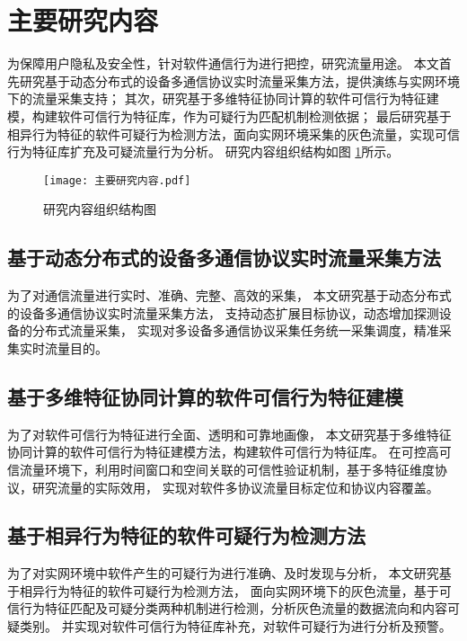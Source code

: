 \section{主要研究内容}

为保障用户隐私及安全性，针对软件通信行为进行把控，研究流量用途。
本文首先研究基于动态分布式的设备多通信协议实时流量采集方法，提供演练与实网环境下的流量采集支持；
其次，研究基于多维特征协同计算的软件可信行为特征建模，构建软件可信行为特征库，作为可疑行为匹配机制检测依据；
最后研究基于相异行为特征的软件可疑行为检测方法，面向实网环境采集的灰色流量，实现可信行为特征库扩充及可疑流量行为分析。
研究内容组织结构如图 \ref{fig:研究内容组织结构图}所示。


 
\FloatBarrier

\begin{figure}[ht]
  \centering
  \texttt{[image: 主要研究内容.pdf]}
  \caption{研究内容组织结构图}
  \label{fig:研究内容组织结构图}
\end{figure} 

\FloatBarrier
 
\subsection{基于动态分布式的设备多通信协议实时流量采集方法}

为了对通信流量进行实时、准确、完整、高效的采集，
本文研究基于动态分布式的设备多通信协议实时流量采集方法，
支持动态扩展目标协议，动态增加探测设备的分布式流量采集，
实现对多设备多通信协议采集任务统一采集调度，精准采集实时流量目的。

\subsection{基于多维特征协同计算的软件可信行为特征建模}

为了对软件可信行为特征进行全面、透明和可靠地画像，
本文研究基于多维特征协同计算的软件可信行为特征建模方法，构建软件可信行为特征库。
在可控高可信流量环境下，利用时间窗口和空间关联的可信性验证机制，基于多特征维度协议，研究流量的实际效用，
实现对软件多协议流量目标定位和协议内容覆盖。

\subsection{基于相异行为特征的软件可疑行为检测方法}

为了对实网环境中软件产生的可疑行为进行准确、及时发现与分析，
本文研究基于相异行为特征的软件可疑行为检测方法，
面向实网环境下的灰色流量，基于可信行为特征匹配及可疑分类两种机制进行检测，分析灰色流量的数据流向和内容可疑类别。
并实现对软件可信行为特征库补充，对软件可疑行为进行分析及预警。
 
